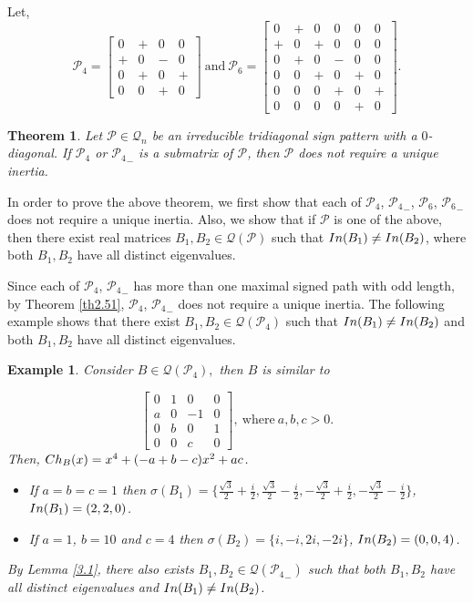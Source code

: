 \documentclass[10pt,a4paper]{amsart}
\newtheorem{theorem}{Theorem}[section]
\newtheorem{eg}{Example}[section]
\numberwithin{equation}{section}
\def\In{{\rm In}}
\def\Ch{{\rm Ch}}
\begin{document}
Let, $$\mathcal{P}_4=\begin{bmatrix}
	0&+&0&0\\+&0&-&0\\0&+&0&+\\0&0&+&0
\end{bmatrix}~\text{and}~\mathcal{P}_6=\begin{bmatrix}
	0&+&0&0&0&0\\+&0&+&0&0&0\\0&+&0&-&0&0\\0&0&+&0&+&0\\0&0&0&+&0&+\\0&0&0&0&+&0
\end{bmatrix}.$$
\begin{theorem}\label{nth3.4}
	Let $\mathcal{P}\in \mathcal{Q}_n$ be an irreducible tridiagonal sign pattern with a $0$-diagonal. If $\mathcal{P}_4$ or ${\mathcal{P}_4}_-$ is a submatrix of $\mathcal{P}$, then $\mathcal{P}$ does not require a unique inertia.
\end{theorem}

In order to prove the above theorem, we first show that each of $\mathcal{P}_4$, ${\mathcal{P}_4}_-$, $\mathcal{P}_6$, ${\mathcal{P}_6}_-$ does not require a unique inertia. Also, we show that if $\mathcal{P}$ is one of the above, then there exist real matrices $B_1, B_2\in \mathcal{Q}(\mathcal{P})$ such that $\In(B_1)\neq \In(B_2)$, where both $B_1, B_2$ have all distinct eigenvalues. 

Since each of $\mathcal{P}_4$, ${\mathcal{P}_4}_-$ has more than one maximal signed path with odd length, by Theorem \ref{th2.51}, $\mathcal{P}_4$, ${\mathcal{P}_4}_-$ does not require a unique inertia. The following example shows that there exist $B_1, B_2\in \mathcal{Q}(\mathcal{P}_4)$ such that $\In(B_1)\neq \In(B_2)$ and both $B_1, B_2$ have all distinct eigenvalues.
\begin{eg} \label{eg3.1}
	Consider $B\in \mathcal{Q}(\mathcal{P}_4),$ then $B$ is similar to
	
	$$\begin{bmatrix}
		0&1&0&0\\ a&0&-1&0\\ 0&b&0&1\\ 0&0&c&0
	\end{bmatrix},~\text{where}~ a,b,c>0.$$ Then, $\Ch_B(x)=x^4+(-a+b-c)x^2+ac$. 
	\begin{itemize}
		\item[i.] If $a=b=c=1$ then $\sigma(B_1)=\{\frac{\sqrt{3}}{2}+\frac{i}{2},\frac{\sqrt{3}}{2}- \frac{i}{2},-\frac{\sqrt{3}}{2}+ \frac{i}{2},- \frac{\sqrt{3}}{2}-\frac{i}{2}\}$, $\In(B_1)=(2,2,0)$.
		\item[ii.] If $a=1$, $b=10$ and $c=4$ then $\sigma(B_2)=\{i,-i, 2i,-2i\}$, $\In(B_2)=(0,0,4)$.
	\end{itemize}
	By Lemma \ref{3.1}, there also exists $B_1,B_2\in \mathcal{Q}({\mathcal{P}_{4}}_-)$ such that both $B_1, B_2$ have all distinct eigenvalues and $\In(B_1)\neq \In(B_2)$.
\end{eg}
\end{document}
